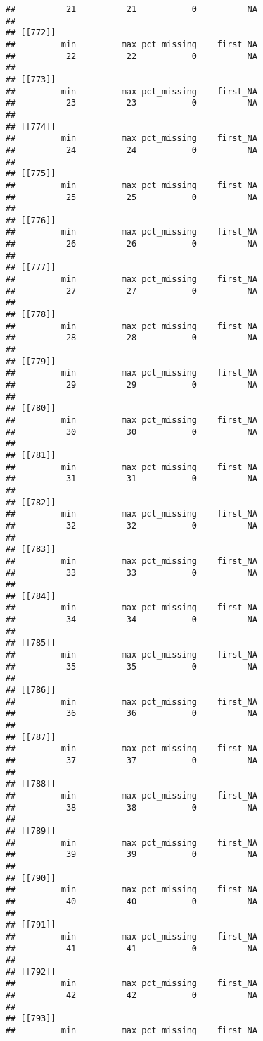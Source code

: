 \documentclass[
]{article}
\begin{document}
\begin{verbatim}
##          21          21           0          NA 
## 
## [[772]]
##         min         max pct_missing    first_NA 
##          22          22           0          NA 
## 
## [[773]]
##         min         max pct_missing    first_NA 
##          23          23           0          NA 
## 
## [[774]]
##         min         max pct_missing    first_NA 
##          24          24           0          NA 
## 
## [[775]]
##         min         max pct_missing    first_NA 
##          25          25           0          NA 
## 
## [[776]]
##         min         max pct_missing    first_NA 
##          26          26           0          NA 
## 
## [[777]]
##         min         max pct_missing    first_NA 
##          27          27           0          NA 
## 
## [[778]]
##         min         max pct_missing    first_NA 
##          28          28           0          NA 
## 
## [[779]]
##         min         max pct_missing    first_NA 
##          29          29           0          NA 
## 
## [[780]]
##         min         max pct_missing    first_NA 
##          30          30           0          NA 
## 
## [[781]]
##         min         max pct_missing    first_NA 
##          31          31           0          NA 
## 
## [[782]]
##         min         max pct_missing    first_NA 
##          32          32           0          NA 
## 
## [[783]]
##         min         max pct_missing    first_NA 
##          33          33           0          NA 
## 
## [[784]]
##         min         max pct_missing    first_NA 
##          34          34           0          NA 
## 
## [[785]]
##         min         max pct_missing    first_NA 
##          35          35           0          NA 
## 
## [[786]]
##         min         max pct_missing    first_NA 
##          36          36           0          NA 
## 
## [[787]]
##         min         max pct_missing    first_NA 
##          37          37           0          NA 
## 
## [[788]]
##         min         max pct_missing    first_NA 
##          38          38           0          NA 
## 
## [[789]]
##         min         max pct_missing    first_NA 
##          39          39           0          NA 
## 
## [[790]]
##         min         max pct_missing    first_NA 
##          40          40           0          NA 
## 
## [[791]]
##         min         max pct_missing    first_NA 
##          41          41           0          NA 
## 
## [[792]]
##         min         max pct_missing    first_NA 
##          42          42           0          NA 
## 
## [[793]]
##         min         max pct_missing    first_NA 

\end{verbatim}
\end{document}
